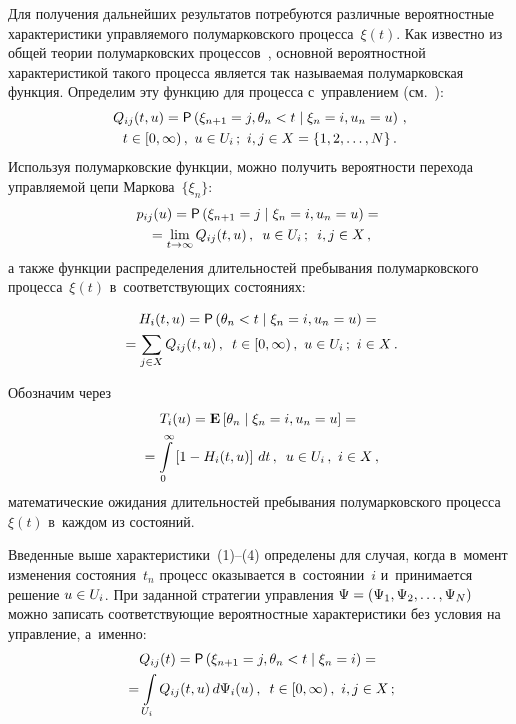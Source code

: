 \begin{multicols}{2}
Для получения дальнейших результатов потребуются различные вероятностные 
характеристики управляемого полумарковского процесса~$\xi(t)$. Как известно из
 общей теории полумарковских процессов~\cite{19, 20}, 
 основной вероятностной характеристикой такого процесса является так называемая 
 полумарковская функция. Определим эту функцию для процесса с~управлением 
 (см.~\cite[гл.~5]{8}):
\begin{multline}
Q_{ij}(t,u)=
{\sf P}\left(\xi_{n+1}=j,\theta_n<t \mid \xi_n=i, u_n=u\right)\,,\\
t\in [0,\infty)\,,\ u\in U_i\,;\ i,j\in X=\{1,2,\ldots,N\}\,. \label{e1}
\end{multline}
Используя полумарковские функции, можно получить вероятности перехода 
управляемой цепи Маркова~$\{\xi_n\}$:
\begin{multline}
p_{ij}(u)={\sf P}\left(\xi_{n+1}=j \mid \xi_n=i, u_n=u\right)= {}\\
{}=
\lim\limits_{t\rightarrow\infty}Q_{ij}(t,u)\,,\enskip
u\in U_i\,;\enskip i,j\in X\,, 
\label{e2}
\end{multline}
а также функции распределения длительностей пребывания полумарковского 
процесса~$\xi(t)$ в~соответствующих состояниях:

\noindent
\begin{multline}
H_{i}(t,u)={\sf P}\left(\theta_n<t \mid \xi_n=i, u_n=u\right)={}\\
{}=
\sum\limits_{j\in X}Q_{ij}(t,u)\,,\enskip
t\in [0,\infty)\,,\  u\in U_i\,; \  i\in X\,. 
\label{e3}
\end{multline}

Обозначим через
\begin{multline}
T_{i}(u)=\mathbf{E}\left[\theta_n \mid \xi_n=i, u_n=u\right]={}\\
{}=
\int\limits_0^{\infty}\left[1-H_i(t,u)\right]\,dt\,,\enskip
u\in U_i\,,\ i\in X\,, 
\label{e4}
\end{multline}
математические ожидания длительностей пребывания полумарковского процесса~$\xi(t)$ 
в~каждом из состояний.

Введенные выше характеристики~(1)--(4) определены для случая, когда 
в~момент изменения состояния~$t_n$ процесс оказывается в~состоянии~$i$ 
и~принимается решение $u\hm\in U_i$. При заданной стратегии управления 
$\Psi\hm=\left(\Psi_1,\Psi_2, \ldots , \Psi_N\right)$ можно записать 
соответствующие вероятностные характеристики без условия на управление, а~именно:
\begin{multline*}
Q_{ij}(t)={\sf P}\left(\xi_{n+1}=j,\theta_n<t \mid \xi_n=i\right)={}\\
{}=
\int\limits_{U_i}Q_{ij}(t,u) \,d\Psi_i(u)\,,\enskip 
t\in [0,\infty)\,,\ i,j\in X\,; %
\end{multline*}


\end{multicols}
